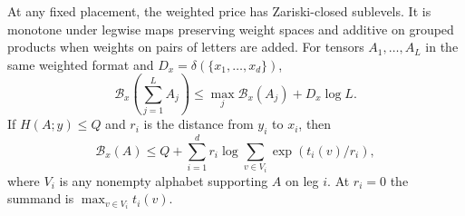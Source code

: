 \begin{lemma}\label{pack:value}
At any fixed placement, the weighted price has Zariski-closed
sublevels. It is monotone under legwise maps preserving weight spaces
and additive on grouped products when weights on pairs of letters are
added. For tensors $A_1,\ldots,A_L$ in the same weighted format and
$D_x=\delta(\{x_1,\ldots,x_d\})$,
\begin{equation}\label{pack:sum}
 \mathcal B_x\!\left(\sum_{j=1}^L A_j\right)
 \le \max_j\mathcal B_x(A_j)+D_x\log L .
\end{equation}
If $H(A;y)\le Q$ and $r_i$ is the distance from $y_i$ to $x_i$, then
\begin{equation}\label{pack:transport}
 \mathcal B_x(A)\le Q+\sum_{i=1}^d r_i
                 \log\sum_{v\in V_i}\exp(t_i(v)/r_i),
\end{equation}
where $V_i$ is any nonempty alphabet supporting $A$ on leg $i$.
At $r_i=0$ the summand is $\max_{v\in V_i}t_i(v)$.
\end{lemma}

